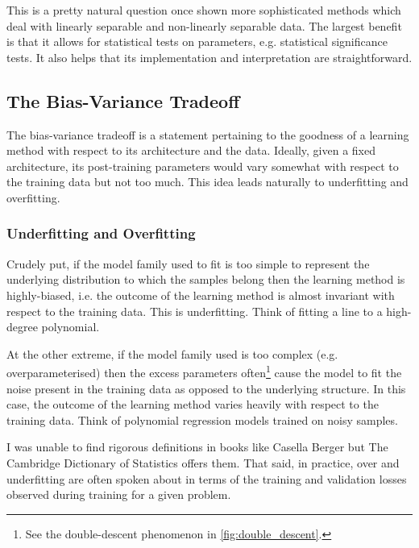 \documentclass[11pt]{article}
\begin{document}
\begin{tcolorbox}[title={\centering\textbf{LR $>$ SVM/RF when?}}, colback=myLightBlue, colbacktitle=myDarkBlue, colframe=myDarkBlue, coltitle=white]
    This is a pretty natural question once shown more sophisticated methods which deal with linearly separable and non-linearly separable data. The largest benefit is that it allows for statistical tests on parameters, e.g. statistical significance tests. It also helps that its implementation and interpretation are straightforward.
\end{tcolorbox}

\subsection{\REV{: }The Bias-Variance Tradeoff}
The bias-variance tradeoff is a statement pertaining to the goodness of a learning method with respect to its architecture and the data. Ideally, given a fixed architecture, its post-training parameters would vary somewhat with respect to the training data but not too much. This idea leads naturally to underfitting and overfitting.

\subsubsection{\TODO{: }Underfitting and Overfitting}
Crudely put, if the model family used to fit is too simple to represent the underlying distribution to which the samples belong then the learning method is highly-biased, i.e. the outcome of the learning method is almost invariant with respect to the training data. This is underfitting. Think of fitting a line to a high-degree polynomial.

At the other extreme, if the model family used is too complex (e.g. overparameterised) then the excess parameters often\footnote{See the double-descent phenomenon in \autoref{fig:double_descent}.} cause the model to fit the noise present in the training data as opposed to the underlying structure. In this case, the outcome of the learning method varies heavily with respect to the training data. Think of polynomial regression models trained on noisy samples.

\begin{tcolorbox}[title={\centering\textbf{Finding rigorous definitions of both}}, colback=myLightBlue, colbacktitle=myDarkBlue, colframe=myDarkBlue, coltitle=white]
    I was unable to find rigorous definitions in books like Casella Berger but The Cambridge Dictionary of Statistics offers them. That said, in practice, over and underfitting are often spoken about in terms of the training and validation losses observed during training for a given problem.
\end{tcolorbox}
\end{document}
